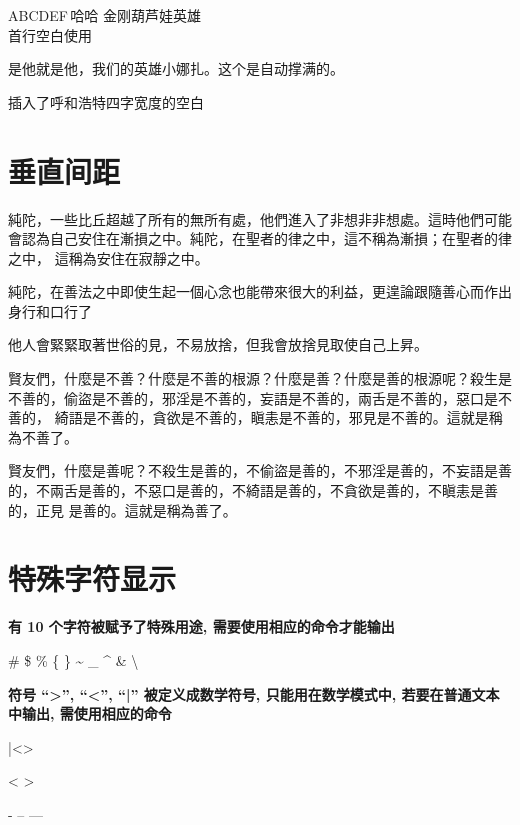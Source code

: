 \documentclass{article}
\begin{document}
    AB\quad{}CD\qquad{}EF\,哈哈
    金刚葫芦娃\hspace{18pt}英雄\\
    \hspace*{20pt}首行空白使用

    \hfill{}是他就是他，我们的英雄小娜扎。这个是自动撑满的。

    \hphantom{呼和浩特}插入了呼和浩特四字宽度的空白
    
    
    \section{垂直间距}
    
    純陀，一些比丘超越了所有的無所有處，他們進入了非想非非想處。這時他們可能
會認為自己安住在漸損之中。純陀，在聖者的律之中，這不稱為漸損；在聖者的律之中，
這稱為安住在寂靜之中。

    \smallskip

    純陀，在善法之中即使生起一個心念也能帶來很大的利益，更遑論跟隨善心而作出
身行和口行了

    \medskip{}

    他人會緊緊取著世俗的見，不易放捨，但我會放捨見取使自己上昇。
    
    \vspace{15pt}

    賢友們，什麼是不善？什麼是不善的根源？什麼是善？什麼是善的根源呢？殺生是
不善的，偷盜是不善的，邪淫是不善的，妄語是不善的，兩舌是不善的，惡口是不善的，
綺語是不善的，貪欲是不善的，瞋恚是不善的，邪見是不善的。這就是稱為不善了。

    \vphantom{賢友們，什麼是善呢？不殺生是善的，不偷盜是善的，不邪淫是善的，不妄語是善
    的，不兩舌是善的，不惡口是善的，不綺語是善的，不貪欲是善的，不瞋恚是善的，正見
    是善的。這就是稱為善了。}

    賢友們，什麼是善呢？不殺生是善的，不偷盜是善的，不邪淫是善的，不妄語是善
的，不兩舌是善的，不惡口是善的，不綺語是善的，不貪欲是善的，不瞋恚是善的，正見
是善的。這就是稱為善了。


    \section{特殊字符显示}
    
    \textbf{有 10 个字符被赋予了特殊用途, 需要使用相应的命令才能输出}

    \# 
    \$ 
    \% 
    \{ 
    \} 
    \~{} 
    \_{} 
    \^{} 
    \& 
    \textbackslash{}
    
    \textbf{符号 “>”, “<”, “|” 被定义成数学符号, 只能用在数学模式中, 若要在普通文本中输出, 需使用相应的命令}

    |<> %

    \textbar
    \textless
    \textgreater
    
    
    - -- ---
\end{document}
